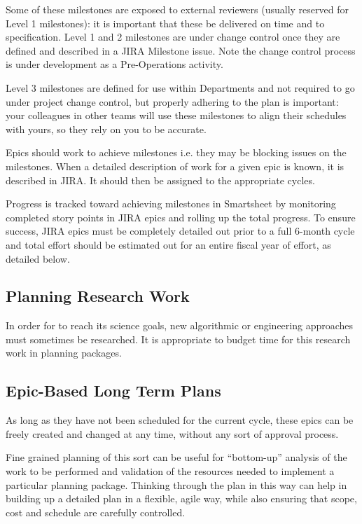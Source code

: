 Some of these milestones are exposed to external reviewers (usually reserved for Level 1 milestones): it is important that these be delivered on time and to specification.
Level 1 and 2 milestones are under change control once they are defined and described in a \gls{JIRA} Milestone issue. Note the change control process is under development as a Pre-Operations activity. 

Level 3 milestones are defined for use within Departments and not required to go under project change control, but properly adhering to the plan is important: your colleagues in other teams will use these milestones to align their schedules with yours, so they rely on you to be accurate.

Epics should work to achieve milestones i.e. they may be blocking issues on the milestones.
When a detailed description of work for a given \gls{epic} is known, it is described in \gls{JIRA}.
It should then be assigned to the appropriate \glspl{cycle}.

Progress is tracked toward achieving milestones in Smartsheet by monitoring completed story points in \gls{JIRA} epics and rolling up the total progress.
To ensure success, \gls{JIRA} epics must be completely detailed out prior to a full 6-month cycle and total effort should be estimated out for an entire fiscal year of effort, as detailed below.

\subsection{Planning Research Work}
\label{sec:long-term-research}

In order for \RO  to reach its science goals, new algorithmic or engineering approaches must sometimes be researched.
It is appropriate to budget time for this research work in planning packages.


\subsection{Epic-Based Long Term Plans}

As long as they have not been scheduled for the current \gls{cycle}, these \glspl{epic} can be freely created and changed at any time, without any sort of approval process.

Fine grained planning of this sort can be useful for ``bottom-up''
analysis of the work to be performed and validation of the resources
needed to implement a particular planning package. Thinking through the
plan in this way can help in building up a detailed plan in a flexible,
agile way, while also ensuring that scope, cost and schedule are
carefully controlled.


